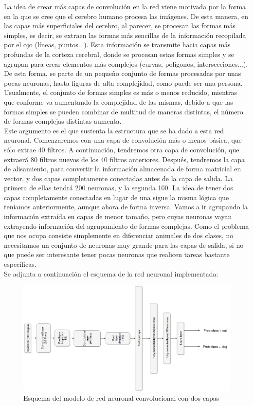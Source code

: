 \documentclass[11pt]{article}
\theoremstyle{plain}
\theoremstyle{definition}
\begin{document}
La idea de crear más capas de convolución en la red viene motivada por
la forma en la que se cree que el cerebro humano procesa las imágenes.
De esta manera, en las capas más superficiales del cerebro, al
parecer, se procesan las formas más simples, es decir, se extraen las
formas más sencillas de la información recopilada por el ojo (líneas,
puntos...). Esta información se transmite hacia capas más profundas de
la corteza cerebral, donde se procesan estas formas simples y se
agrupan para crear elementos más complejos (curvas, polígonos,
intersecciones...). De esta forma, se parte de un pequeño conjunto de
formas procesadas por unas pocas neuronas, hasta figuras de alta
complejidad, como puede ser una persona. Usualmente, el conjunto de
formas simples es más o menos reducido, mientras que conforme va
aumentando la complejidad de las mismas, debido a que las formas
simples se pueden combinar de multitud de maneras distintas, el número
de formas complejas distintas aumenta.\\

Este argumento es el que sustenta la estructura que se ha dado a esta
red neuronal. Comenzaremos con una capa de convolución más o menos
básica, que sólo extrae 40 filtros. A continuación, tendremos otra
capa de convolución, que extraerá 80 filtros nuevos de los 40 filtros
anteriores. Después, tendremos la capa de alisamiento, para convertir
la información almacenada de forma matricial en vector, y dos capas
completamente conectadas antes de la capa de salida. La primera de
ellas tendrá 200 neuronas, y la segunda 100. La idea de tener dos
capas completamente conectadas en lugar de una sigue la misma lógica
que teníamos anteriormente, aunque ahora de forma inversa. Vamos a ir
agrupando la información extraída en capas de menor tamaño, pero cuyas
neuronas vayan extrayendo información del agrupamiento de formas
complejas. Como el problema que nos ocupa consiste simplemente en
diferenciar animales de dos clases, no necesitamos un conjunto de
neuronas muy grande para las capas de salida, si no que puede ser
interesante tener pocas neuronas que realicen tareas bastante
específicas.\\

Se adjunta a continuación el esquema de la red neuronal implementada:

\begin{figure}[H]
  \centering
  \includegraphics[width=.7\textwidth]{imgs/2conv_model.png}
  \caption{Esquema del modelo de red neuronal convolucional con dos
    capas}
\end{figure}
\end{document}
